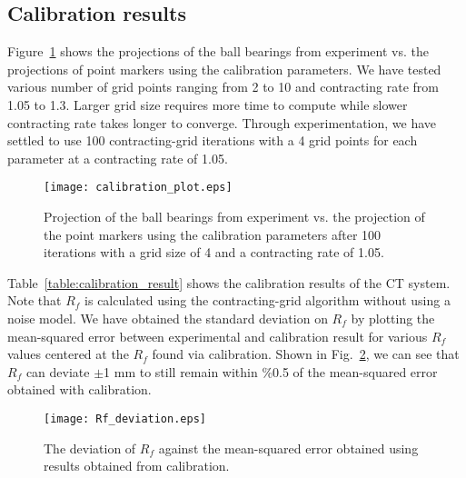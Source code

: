 \subsection{Calibration results}
\label{subsect:cali_results}
Figure~\ref{fig:calibration_plot} shows the projections of the ball bearings from experiment vs. the projections of point markers using the calibration parameters.  We have tested various number of grid points ranging from 2 to 10 and contracting rate from 1.05 to 1.3.  Larger grid size requires more time to compute while slower contracting rate takes longer to converge.  Through experimentation, we have settled to use 100 contracting-grid iterations with a 4 grid points for each parameter at a contracting rate of 1.05.
%
\begin{figure}[h]
\texttt{[image: calibration\_plot.eps]}
\caption{Projection of the ball bearings from experiment vs. the projection of the point markers using the calibration parameters after 100 iterations with a grid size of 4 and a contracting rate of 1.05.}
\label{fig:calibration_plot}
\end{figure}

Table~\ref{table:calibration_result} shows the calibration results of the CT system.  Note that $R_f$ is calculated using the contracting-grid algorithm without using a noise model.  We have obtained the standard deviation on $R_f$ by plotting the mean-squared error between experimental and calibration result for various $R_f$ values centered at the $R_f$ found via calibration.  Shown in Fig.~\ref{fig:Rf_deviation}, we can see that $R_f$ can deviate $\pm$1 mm to still remain within \%0.5 of the mean-squared error obtained with calibration.
%
\begin{figure}
	\texttt{[image: Rf\_deviation.eps]}
	\caption{The deviation of $R_f$ against the mean-squared error obtained using results obtained from calibration.}
	\label{fig:Rf_deviation}
\end{figure}
%

